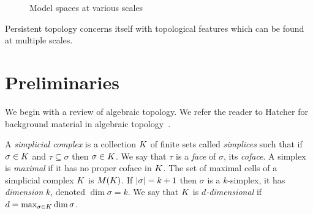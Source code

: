  \begin{figure}
\centering
 \hspace{.5cm}
 \hspace{.25cm}
 \hspace{.25cm}
\caption{Model spaces at various scales}
\end{figure}

 Persistent topology concerns itself with topological features which can be found at multiple scales.

\section{Preliminaries}
We begin with a review of algebraic topology. 
We refer the reader to Hatcher for background material in algebraic topology~\cite{hatcher}.

A \emph{simplicial complex} is a collection $K$ of finite sets called
\emph{simplices} such that if $\sigma \in K$ and $\tau \subseteq \sigma$ then 
$\sigma \in K$. We say that $\tau$ is a \emph{face} of $\sigma$, its \emph{coface}. A simplex
is \emph{maximal} if it has no proper coface in $K$. The set of maximal cells of a 
simplicial complex $K$ is $M(K)$. If $|\sigma| = k+1$
then $\sigma$ is a $k$-simplex, it has \emph{dimension} $k$, denoted 
$\dim{\sigma} = k$. We say that $K$ is \emph{$d$-dimensional} if 
$d = \max_{\sigma \in K} \dim{\sigma}$. 

